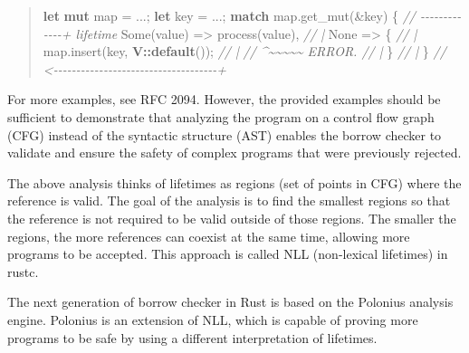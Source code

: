 \documentclass[
  11pt,
  twoside,symmetric]{report}
\newenvironment{Shaded}{}{}
\newcommand{\CommentTok}[1]{\textit{#1}}
\newcommand{\ConstantTok}[1]{#1}
\newcommand{\ControlFlowTok}[1]{\textbf{#1}}
\newcommand{\KeywordTok}[1]{\textbf{#1}}
\newcommand{\NormalTok}[1]{#1}
\newcommand{\OperatorTok}[1]{#1}
\newcommand{\PreprocessorTok}[1]{\textbf{#1}}
\begin{document}
\begin{quote}
\begin{Shaded}
\begin{Highlighting}[]
\KeywordTok{let} \KeywordTok{mut}\NormalTok{ map }\OperatorTok{=} \OperatorTok{...;}
\KeywordTok{let}\NormalTok{ key }\OperatorTok{=} \OperatorTok{...;}
\ControlFlowTok{match}\NormalTok{ map}\OperatorTok{.}\NormalTok{get\_mut(}\OperatorTok{\&}\NormalTok{key) }\OperatorTok{\{} \CommentTok{// {-}{-}{-}{-}{-}{-}{-}{-}{-}{-}{-}{-}{-}+ \textquotesingle{}lifetime}
    \ConstantTok{Some}\NormalTok{(value) }\OperatorTok{=\textgreater{}}\NormalTok{ process(value)}\OperatorTok{,}     \CommentTok{// |}
    \ConstantTok{None} \OperatorTok{=\textgreater{}} \OperatorTok{\{}                          \CommentTok{// |}
\NormalTok{        map}\OperatorTok{.}\NormalTok{insert(key}\OperatorTok{,} \PreprocessorTok{V::}\KeywordTok{default}\NormalTok{())}\OperatorTok{;} \CommentTok{// |}
        \CommentTok{//  \^{}\textasciitilde{}\textasciitilde{}\textasciitilde{}\textasciitilde{}\textasciitilde{} ERROR.              // |}
    \OperatorTok{\}}                                  \CommentTok{// |}
\OperatorTok{\}} \CommentTok{// \textless{}{-}{-}{-}{-}{-}{-}{-}{-}{-}{-}{-}{-}{-}{-}{-}{-}{-}{-}{-}{-}{-}{-}{-}{-}{-}{-}{-}{-}{-}{-}{-}{-}{-}{-}{-}{-}+}
\end{Highlighting}
\end{Shaded}
\end{quote}

For more examples, see RFC 2094.
However, the provided examples should be sufficient to demonstrate that
analyzing the program on a control flow graph (CFG) instead of the
syntactic structure (AST) enables the borrow checker to validate and
ensure the safety of complex programs that were previously rejected.

The above analysis thinks of lifetimes as regions (set of points in CFG)
where the reference is valid. The goal of the analysis is to find the
smallest regions so that the reference is not required to be valid
outside of those regions. The smaller the regions, the more references
can coexist at the same time, allowing more programs to be accepted.
This approach is called NLL (non-lexical lifetimes) in rustc.

The next generation of borrow checker in Rust is based on the Polonius
analysis engine. Polonius is an extension of NLL, which is capable of
proving more programs to be safe by using a different interpretation of
lifetimes.
\end{document}
